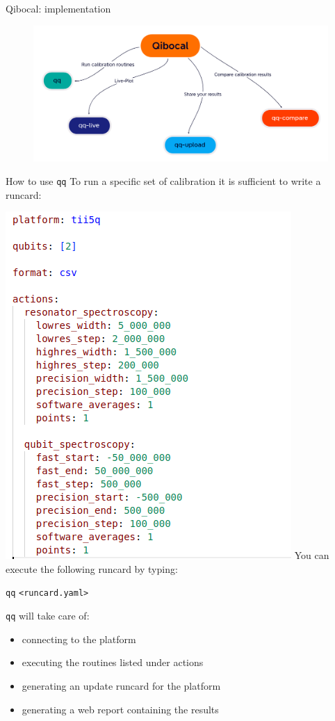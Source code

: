 \documentclass[11p,aspectratio=169]{beamer}
\begin{document}
\begin{frame}{Qibocal: implementation}
    \begin{figure}
        \includegraphics[width= \textwidth]{figures/Qibocal.png}
    \end{figure}
\end{frame}



\begin{frame}{How to use \texttt{qq}}
    To run a specific set of calibration it is sufficient to write a runcard:
    \begin{multicols*}{2}
        \includegraphics[width= 0.5 \textwidth]{figures/runcard.png}
        You can execute the following runcard by typing:
        \begin{center}
            \texttt{qq} \texttt{<runcard.yaml>} 
        \end{center}

    \texttt{qq} will take care of:
    \begin{itemize}
        \item connecting to the platform
        \item executing the routines listed under actions
        \item generating an update runcard for the platform
        \item generating a web report containing the results
    \end{itemize}
    \end{multicols*}
    \
\end{frame}
\end{document}
